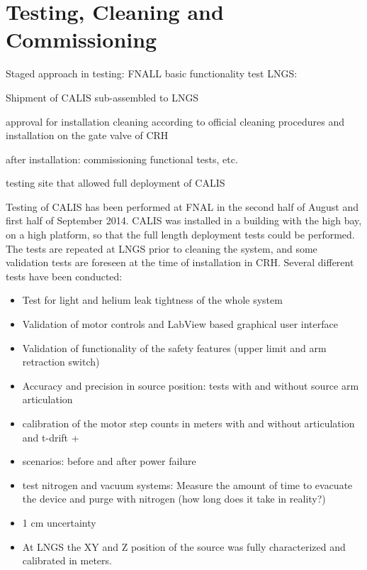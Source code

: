 \section{Testing, Cleaning and Commissioning} \label{sec:Testing}\label{sec:Commissioning}
Staged approach in testing: FNALL basic functionality test
LNGS:

Shipment of CALIS sub-assembled to LNGS

approval for installation 
cleaning according to official cleaning procedures and installation on the gate valve of CRH

after installation: commissioning functional tests, etc.

testing site that allowed full deployment of CALIS

Testing of CALIS has been performed at FNAL in the second half of August and first half of September 2014. CALIS was installed in a building with the high bay, on a high platform, so that the full length deployment tests could be performed. The tests are repeated at LNGS prior to cleaning the system, and some validation tests are foreseen at the time of installation in CRH.  Several different tests have been conducted:
\begin{itemize}
\item Test for light and helium leak tightness of the whole system

\item Validation of motor controls and LabView based graphical user interface 
\item Validation of functionality of the safety features (upper limit and arm retraction switch)
\item Accuracy and precision in source position: tests with and without source arm articulation
\item calibration of the motor step counts in meters with and without articulation and t-drift + 
\item scenarios: before and after power failure
\item test nitrogen and vacuum systems: Measure the amount of time to evacuate the device and purge with nitrogen (how long does it take in reality?)
\item 1 cm uncertainty
\item At LNGS the XY and Z position of the source was fully characterized and calibrated in meters.
\end{itemize}

